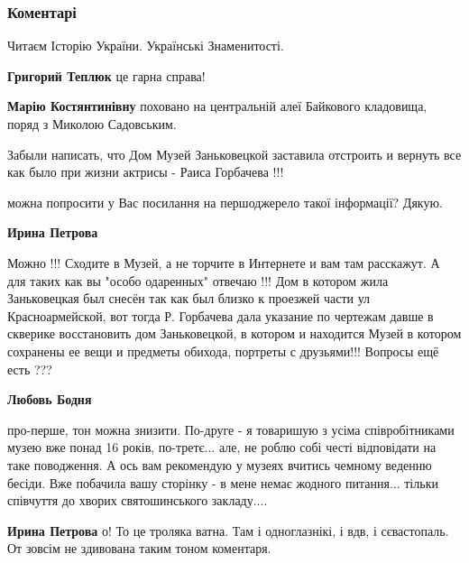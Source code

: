  
 
 
 
 
\subsubsection{Коментарі}

\begin{itemize} %
Читаєм
Історію України. Українські
Знаменитості.

\textbf{Григорий Теплюк} це гарна справа!

\textbf{Марію Костянтинівну} поховано на центральній алеї Байкового кладовища, поряд з Миколою Садовським.


Забыли написать, что Дом Музей Заньковецкой заставила отстроить и вернуть все
как было при жизни актрисы - Раиса Горбачева !!!

\begin{itemize} %
можна попросити у Вас посилання на першоджерело такої інформації? Дякую.

\textbf{Ирина Петрова} 

Можно !!! Сходите в Музей, а не торчите в Интернете и вам там расскажут. А для
таких как вы "особо одаренных" отвечаю !!! Дом в котором жила Заньковецкая был
снесён так как был близко к проезжей части ул Красноармейской, вот тогда Р.
Горбачева дала указание по чертежам давше в скверике восстановить дом
Заньковецкой, в котором и находится Музей в котором сохранены ее вещи и
предметы обихода, портреты с друзьями!!! Вопросы ещё есть ???

\textbf{Любовь Бодня} 

про-перше, тон можна знизити. По-друге - я товаришую з усіма співробітниками
музею вже понад 16 років, по-третє... але, не роблю собі честі відповідати на
таке поводження. А ось вам рекомендую у музеях вчитись чемному веденню бесіди.
Вже побачила вашу сторінку - в мене немає жодного питання... тільки співчуття до
хворих святошинського закладу....

\textbf{Ирина Петрова} о! То це троляка ватна. Там і одноглазнікі, і вдв, і сєвастопаль. От зовсім не здивована таким тоном коментаря.


\end{itemize}
\end{itemize}
